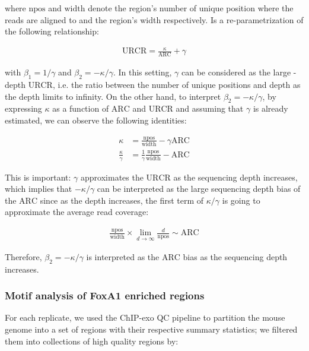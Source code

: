 \documentclass{bmcart}
\begin{document}
where $\mbox{npos}$ and $\mbox{width}$ denote the region's number of
unique position where the reads are aligned to and the region's width
respectively. Is a re-parametrization of the following relationship:

\begin{align}
  \mbox{URCR} = \frac{\kappa}{\mbox{ARC}} + \gamma
\label{mod}
\end{align}

with $\beta_1 = 1 / \gamma$ and $\beta_2 = - \kappa / \gamma$. In this
setting, $\gamma$ can be considered as the large - depth
$\mbox{URCR}$, i.e. the ratio between the number of unique positions
and depth as the depth limits to infinity. On the other hand, to
interpret $\beta_2 = - \kappa / \gamma $, by expressing $\kappa$ as a
function of $\mbox{ARC}$ and $\mbox{URCR}$ and assuming that $\gamma$
is already estimated, we can observe the following identities:

\begin{align*}
  \kappa &= \frac{\mbox{npos}}{\mbox{width}} - \gamma \mbox{ARC} \\
  \frac{\kappa}{\gamma} &= \frac{1}{\gamma} \frac{\mbox{npos}}{\mbox{width}} - \mbox{ARC} 
\end{align*}

This is important: $\gamma$ approximates the $\mbox{URCR}$ as the
sequencing depth increases, which implies that $- \kappa / \gamma$ can
be interpreted as the large sequencing depth bias of the $\mbox{ARC}$
since as the depth increases, the first term of $\kappa / \gamma$ is
going to approximate the average read coverage:

\begin{align*}
  \frac{\mbox{npos}}{\mbox{width}} \times \lim_{d \rightarrow
    \infty} \frac{d }{\mbox{npos}} \sim \mbox{ARC} 
\end{align*}

Therefore, $\beta_2 = - \kappa / \gamma$ is interpreted as the
$\mbox{ARC}$ bias as the sequencing depth increases.


\subsubsection*{Motif analysis of FoxA1 enriched regions}

For each replicate, we used the ChIP-exo QC pipeline to partition the
mouse genome into a set of regions with their respective summary
statistics; we filtered them into collections of high quality regions
by:
\end{document}

